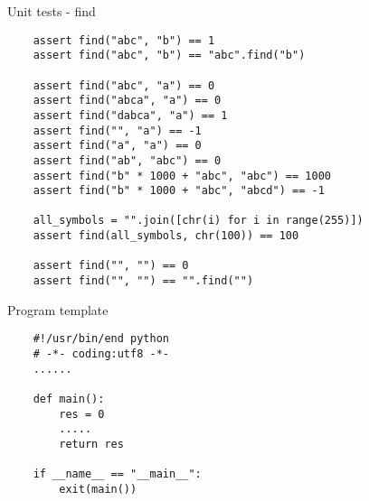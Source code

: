 \documentclass{article}
\begin{document}
\begin{center} Unit tests - find \end{center}
\begin{lstlisting}
	assert find("abc", "b") == 1
	assert find("abc", "b") == "abc".find("b")

	assert find("abc", "a") == 0
	assert find("abca", "a") == 0
	assert find("dabca", "a") == 1
	assert find("", "a") == -1
	assert find("a", "a") == 0
	assert find("ab", "abc") == 0
	assert find("b" * 1000 + "abc", "abc") == 1000
	assert find("b" * 1000 + "abc", "abcd") == -1

	all_symbols = "".join([chr(i) for i in range(255)])
	assert find(all_symbols, chr(100)) == 100

	assert find("", "") == 0
	assert find("", "") == "".find("")
\end{lstlisting}
\newpage
\begin{center} Program template \end{center}
\begin{lstlisting}
	#!/usr/bin/end python
	# -*- coding:utf8 -*-
	......

	def main():
		res = 0
		.....
		return res

	if __name__ == "__main__":
		exit(main())
\end{lstlisting}
\newpage

\end{document}
